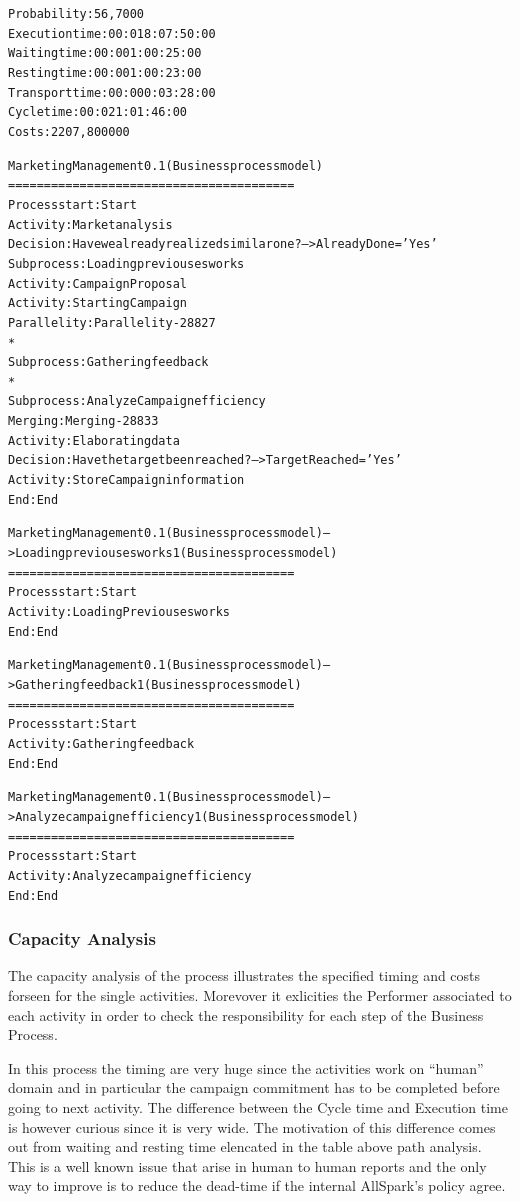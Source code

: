 
\begin{alltt}
Probability:   56,7000%
Execution time:  00:018:07:50:00
Waiting time:  00:001:00:25:00
Resting time:  00:001:00:23:00
Transport time:  00:000:03:28:00
Cycle time:  00:021:01:46:00
Costs:  2207,800000

Marketing Management 0.1 (Business process model)
========================================
Process start: Start
Activity: Market analysis
Decision: Have we already realized similar one? --> AlreadyDone = 'Yes'
Subprocess: Loading previouses works
Activity: Campaign Proposal
Activity: Starting Campaign
Parallelity: Parallelity-28827
    *
    Subprocess: Gathering feedback
    *
    Subprocess: Analyze Campaign efficiency
Merging: Merging-28833
Activity: Elaborating data
Decision: Have the target been reached? --> TargetReached = 'Yes'
Activity: Store Campaign information
End: End

Marketing Management 0.1 (Business process model) --> Loading previouses works 1 (Business process model)
========================================
Process start: Start
Activity: Loading Previouses works
End: End

Marketing Management 0.1 (Business process model) --> Gathering feedback 1 (Business process model)
========================================
Process start: Start
Activity: Gathering feedback
End: End

Marketing Management 0.1 (Business process model) --> Analyze campaign efficiency 1 (Business process model)
========================================
Process start: Start
Activity: Analyze campaign efficiency
End: End
\end{alltt}


\subsubsection{Capacity Analysis}
The capacity analysis of the process illustrates the specified timing and costs forseen for the single activities. Morevover it exlicities the Performer associated to each activity in order to check the responsibility for each step of the Business Process.

In this process the timing are very huge since the activities work on ``human'' domain and in particular the campaign commitment has to be completed before going to next activity. The difference between the Cycle time and Execution time is however curious since it is very wide. The motivation of this difference comes out from waiting and resting time elencated in the table above path analysis. This is a well known issue that arise in human to human reports and the only way to improve is to reduce the dead-time if the internal AllSpark's policy agree.

